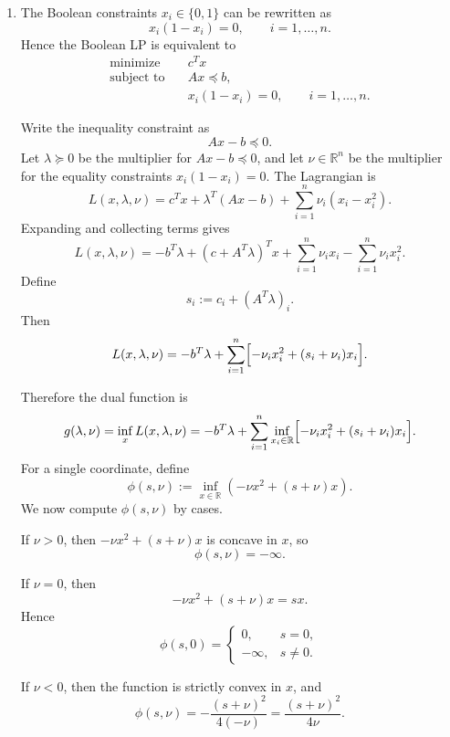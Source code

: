 \documentclass[11pt,letter,notitlepage]{article}
\theoremstyle{definition}
\begin{document}
\begin{solution}
\leavevmode\vspace{-2em}

\begin{enumerate}
    \item[(a)] The Boolean constraints $x_i\in\{0,1\}$ can be rewritten as
    \[
    x_i(1-x_i)=0,\qquad i=1,\dots,n.
    \]
    Hence the Boolean LP is equivalent to
    \[
    \begin{aligned}
        \text{minimize}\quad & c^T x\\
        \text{subject to}\quad & Ax\preceq b,\\
        & x_i(1-x_i)=0,\qquad i=1,\dots,n.
    \end{aligned}
    \]

    Write the inequality constraint as
    \[
    Ax-b\preceq 0.
    \]
    Let $\lambda\succeq 0$ be the multiplier for $Ax-b\preceq 0$, and let
    $\nu\in\mathbb{R}^n$ be the multiplier for the equality constraints
    $x_i(1-x_i)=0$. The Lagrangian is
    \[
    L(x,\lambda,\nu)
    =
    c^T x+\lambda^T(Ax-b)+\sum_{i=1}^n \nu_i(x_i-x_i^2).
    \]
    Expanding and collecting terms gives
    \[
    L(x,\lambda,\nu)
    =
    -b^T\lambda
    +(c+A^T\lambda)^T x
    +\sum_{i=1}^n \nu_i x_i
    -\sum_{i=1}^n \nu_i x_i^2.
    \]
    Define
    \[
    s_i:=c_i+(A^T\lambda)_i.
    \]
    Then
    \[
    L(x,\lambda,\nu)
    =
    -b^T\lambda+\sum_{i=1}^n\Bigl[-\nu_i x_i^2+(s_i+\nu_i)x_i\Bigr].
    \]

    Therefore the dual function is
    \[
    g(\lambda,\nu)
    =
    \inf_x L(x,\lambda,\nu)
    =
    -b^T\lambda+\sum_{i=1}^n
    \inf_{x_i\in\mathbb{R}}
    \Bigl[-\nu_i x_i^2+(s_i+\nu_i)x_i\Bigr].
    \]
    For a single coordinate, define
    \[
    \phi(s,\nu):=
    \inf_{x\in\mathbb{R}}\left(-\nu x^2+(s+\nu)x\right).
    \]
    We now compute $\phi(s,\nu)$ by cases.

    If $\nu>0$, then $-\nu x^2+(s+\nu)x$ is concave in $x$, so
    \[
    \phi(s,\nu)=-\infty.
    \]

    If $\nu=0$, then
    \[
    -\nu x^2+(s+\nu)x=sx.
    \]
    Hence
    \[
    \phi(s,0)=
    \begin{cases}
        0, & s=0,\\
        -\infty, & s\neq 0.
    \end{cases}
    \]

    If $\nu<0$, then the function is strictly convex in $x$, and
    \[
    \phi(s,\nu)
    =
    -\frac{(s+\nu)^2}{4(-\nu)}
    =
    \frac{(s+\nu)^2}{4\nu}.
    \]


\end{enumerate}
\end{solution}
\end{document}
